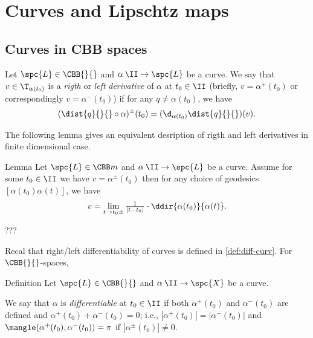 \chapter{Curves and Lipschtz maps}


\section{Curves in CBB spaces}

Let
$\spc{L}\in\CBB{}{}$ 
and $\alpha\:\II\to \spc{L}$ be a curve.
We say that $v\in\T_{\alpha(t_0)}$ is a \emph{rigth} or \emph{left} \emph{derivative} of $\alpha$ at $t_0\in\II$ (briefly, $v=\alpha^+(t_0)$ or correspondingly $v=\alpha^-(t_0)$)
if 
for any $q\not=\alpha(t_0)$, we have
\[(\dist{q}{}{}\circ\alpha)^\pm(t_0)=(\d_{\alpha(t_0)}\dist{q}{}{})(v).\]



The following lemma gives an equivalent desription of rigth and left derivatives in finite dimensional case.


\begin{thm}{Lemma}
Let $\spc{L}\in\CBB m{}$ and $\alpha\:\II\to \spc{L}$ be a curve.
Assume for some $t_0\in \II$ we have $v=\alpha^\pm(t_0)$ then 
for any choice of geodesics $[\alpha(t_0)\alpha(t)]$, we have
\[v=\lim_{t\to t_0\pm}\tfrac{1}{|t-t_0|}\cdot\ddir{\alpha(t_0)}{\alpha(t)}.\]

\end{thm}

???
\qeds

Recal that right/left differentiability of curves is defined in \ref{def:diff-curv}.
For $\CBB{}{}$-spaces, 

\begin{thm}{Definition}\label{def:diff-curv-yet}
Let
$\spc{L}\in \CBB{}{}$  
and $\alpha\:\II\to \spc{X}$ be a curve.

We say that $\alpha$ is \emph{differentiable} at $t_0\in\II$ if 
both $\alpha^+(t_0)$ and $\alpha^-(t_0)$ are defined and $\alpha^+(t_0)+\alpha^-(t_0)=0$; i.e.,  $|\alpha^+(t_0)|=|\alpha^-(t_0)|$ and 
$\mangle(\alpha^+(t_0),\alpha^-(t_0))=\pi$ if $|\alpha^\pm(t_0)|\ne 0$.
\end{thm}





